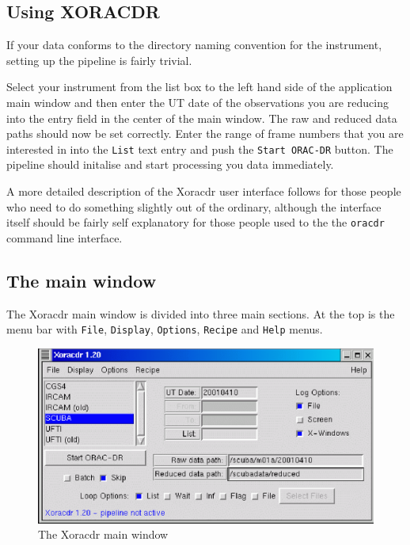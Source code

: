 \documentclass[twoside,11pt]{article}
\renewcommand{\_}{\texttt{\symbol{95}}}
\begin{document}
\subsection*{Using XORACDR\label{Xoracdr_USING_XORACDR}}

If your data conforms to the directory naming convention for the
instrument, setting up the pipeline is fairly trivial.



Select your instrument from the list box to the left hand side of the
application main window and then enter the UT date of the observations
you are reducing into the entry field in the center of the main
window. The raw and reduced data paths should now be set
correctly. Enter the range of frame numbers that you are interested in
into the \texttt{List} text entry and push the \texttt{Start ORAC-DR} button. The
pipeline should initalise and start processing you data immediately.



A more detailed description of the Xoracdr user interface follows for
those people who need to do something slightly out of the ordinary,
although the interface itself should be fairly self explanatory for
those people used to the the \texttt{oracdr} command line interface.

\subsection*{The main window\label{Xoracdr_THE_MAIN_WINDOW}}

The Xoracdr main window is divided into three main sections. At the
top is the menu bar with \texttt{File}, \texttt{Display}, \texttt{Options}, \texttt{Recipe}
and \texttt{Help} menus.

\begin{figure}
\begin{center}
\includegraphics[width=5.0in]{sun230_xoracdr.eps}
\caption{The Xoracdr main window}
\end{center}
\end{figure}
\end{document}
